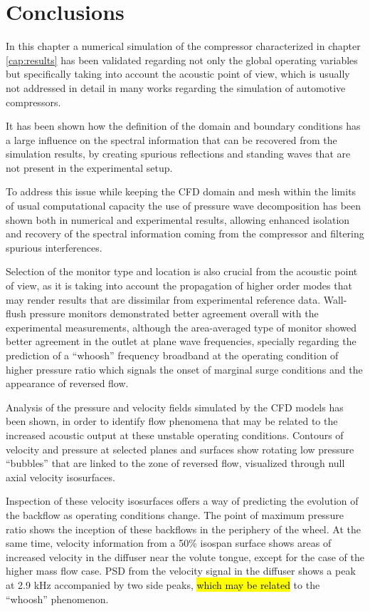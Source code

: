 \section{Conclusions}

In this chapter a numerical simulation of the compressor characterized in chapter \ref{cap:results} has been validated regarding not only the global operating variables but specifically taking into account the acoustic point of view, which is usually not addressed in detail in many works regarding the simulation of automotive compressors.

It has been shown how the definition of the domain and boundary conditions has a large influence on the spectral information that can be recovered from the simulation results, by creating spurious reflections and standing waves that are not present in the experimental setup.

To address this issue while keeping the CFD domain and mesh within the limits of usual computational capacity the use of pressure wave decomposition has been shown both in numerical and experimental results, allowing enhanced isolation and recovery of the spectral information coming from the compressor and filtering spurious interferences.

Selection of the monitor type and location is also crucial from the acoustic point of view, as it is taking into account the propagation of higher order modes that may render results that are dissimilar from experimental reference data. Wall-flush pressure monitors demonstrated better agreement overall with the experimental measurements, although the area-averaged type of monitor showed better agreement in the outlet at plane wave frequencies, specially regarding the prediction of a ``whoosh'' frequency broadband at the operating condition of higher pressure ratio which signals the onset of marginal surge conditions and the appearance of reversed flow.

Analysis of the pressure and velocity fields simulated by the CFD models has been shown, in order to identify flow phenomena that may be related to the increased acoustic output at these unstable operating conditions. Contours of velocity and pressure at selected planes and surfaces show rotating low pressure ``bubbles'' that are linked to the zone of reversed flow, visualized through null axial velocity isosurfaces.

Inspection of these velocity isosurfaces offers a way of predicting the evolution of the backflow as operating conditions change. The point of maximum pressure ratio shows the inception of these backflows in the periphery of the wheel. At the same time, velocity information from a 50\% isospan surface shows areas of increased velocity in the diffuser near the volute tongue, except for the case of the higher mass flow case. PSD from the velocity signal in the diffuser shows a peak at 2.9 kHz accompanied by two side peaks, \hl{which may be related} to the ``whoosh'' phenomenon.


